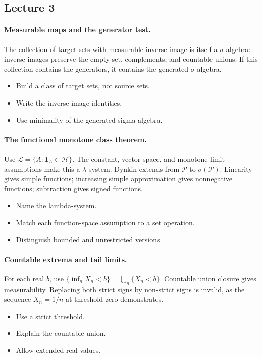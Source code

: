 \documentclass[11pt,letterpaper]{article}
\begin{document}
\subsection{Lecture 3}
\hypertarget{answer-l3-s2}{}\paragraph{Measurable maps and the generator test.}
The collection of target sets with measurable inverse image is itself a $\sigma$-algebra: inverse images preserve the empty set, complements, and countable unions. If this collection contains the generators, it contains the generated $\sigma$-algebra.
\begin{itemize}
\item Build a class of target sets, not source sets.
\item Write the inverse-image identities.
\item Use minimality of the generated sigma-algebra.
\end{itemize}
\hypertarget{answer-l3-s6}{}\paragraph{The functional monotone class theorem.}
Use $\mathcal L=\{A:\mathbf1_A\in\mathcal H\}$. The constant, vector-space, and monotone-limit assumptions make this a $\lambda$-system. Dynkin extends from $\mathcal P$ to $\sigma(\mathcal P)$. Linearity gives simple functions; increasing simple approximation gives nonnegative functions; subtraction gives signed functions.
\begin{itemize}
\item Name the lambda-system.
\item Match each function-space assumption to a set operation.
\item Distinguish bounded and unrestricted versions.
\end{itemize}
\hypertarget{answer-l3-s8}{}\paragraph{Countable extrema and tail limits.}
For each real $b$, use $\{\inf_nX_n<b\}=\bigcup_n\{X_n<b\}$. Countable union closure gives measurability. Replacing both strict signs by non-strict signs is invalid, as the sequence $X_n=1/n$ at threshold zero demonstrates.
\begin{itemize}
\item Use a strict threshold.
\item Explain the countable union.
\item Allow extended-real values.
\end{itemize}
\end{document}
